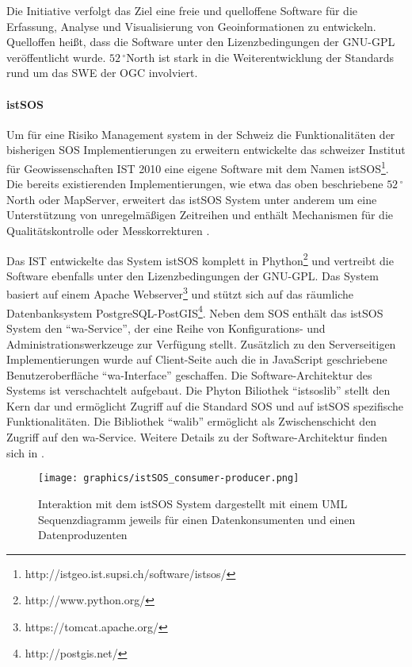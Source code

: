 Die Initiative verfolgt das Ziel eine freie und quelloffene Software für die Erfassung, Analyse und Visualisierung von Geoinformationen zu entwickeln. Quelloffen heißt, dass die Software unter den Lizenzbedingungen der \gls{GNU-GPL} veröffentlicht wurde. $52\,^{\circ}$North ist stark in die Weiterentwicklung der Standards rund um das \gls{SWE} der \gls{OGC} involviert.

\paragraph{istSOS}
Um für eine Risiko Management system in der Schweiz die Funktionalitäten der bisherigen \gls{SOS} Implementierungen zu erweitern entwickelte das schweizer Institut für Geowissenschaften \gls{IST} 2010 eine eigene Software mit dem Namen \gls{istSOS}\footnote{http://istgeo.ist.supsi.ch/software/istsos/}. Die bereits existierenden Implementierungen, wie etwa das oben beschriebene $52\,^{\circ}$North  oder MapServer, erweitert das \gls{istSOS} System unter anderem um eine Unterstützung von unregelmäßigen Zeitreihen und enthält Mechanismen für die Qualitätskontrolle oder Messkorrekturen \citep{cannata_istsos_2013}. 

Das \gls{IST} entwickelte das System \gls{istSOS} komplett in Phython\footnote{http://www.python.org/} und vertreibt die Software ebenfalls unter den Lizenzbedingungen der \gls{GNU-GPL}. Das System basiert auf einem Apache Webserver\footnote{https://tomcat.apache.org/} und stützt sich auf das räumliche Datenbanksystem PostgreSQL-PostGIS\footnote{http://postgis.net/}. Neben dem \gls{SOS} enthält das \gls{istSOS} System den ``wa-Service'', der eine Reihe von Konfigurations- und Administrationswerkzeuge zur Verfügung stellt. Zusätzlich zu den Serverseitigen Implementierungen wurde auf Client-Seite auch die in JavaScript geschriebene Benutzeroberfläche ``wa-Interface'' geschaffen. Die Software-Architektur des Systems ist verschachtelt aufgebaut. Die Phyton Biliothek ``istsoslib'' stellt den Kern dar und ermöglicht Zugriff auf die Standard \gls{SOS} und auf \gls{istSOS} spezifische Funktionalitäten. Die Bibliothek ``walib'' ermöglicht als Zwischenschicht den Zugriff auf den wa-Service. Weitere Details zu der Software-Architektur finden sich in \citep{cannata_istsos_2013}\citep{cannata_istsos:_2010}.

\begin{figure}[H]
	\centering
 	 \texttt{[image: graphics/istSOS\_consumer-producer.png]} 
	\caption{Interaktion mit dem istSOS System dargestellt mit einem UML Sequenzdiagramm jeweils für einen Datenkonsumenten und einen Datenproduzenten \citep{cannata_welcome_2014}}
	 \label{fig:istsos_consumer-producer}
\end{figure}

